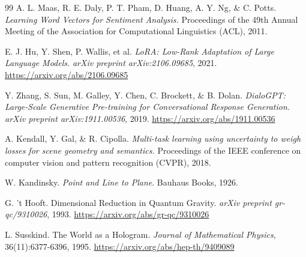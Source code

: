 \documentclass[11pt, a4paper]{article}
\begin{document}
\begin{thebibliography}{99}
			A. L. Maas, R. E. Daly, P. T. Pham, D. Huang, A. Y. Ng, \& C. Potts.
			\textit{Learning Word Vectors for Sentiment Analysis.}
			Proceedings of the 49th Annual Meeting of the Association for Computational Linguistics (ACL), 2011.
			
			E. J. Hu, Y. Shen, P. Wallis, et al.
			\textit{LoRA: Low-Rank Adaptation of Large Language Models.}
			\textit{arXiv preprint arXiv:2106.09685}, 2021. \url{https://arxiv.org/abs/2106.09685}
			
			Y. Zhang, S. Sun, M. Galley, Y. Chen, C. Brockett, \& B. Dolan.
			\textit{DialoGPT: Large-Scale Generative Pre-training for Conversational Response Generation.}
			\textit{arXiv preprint arXiv:1911.00536}, 2019. \url{https://arxiv.org/abs/1911.00536}
			
			A. Kendall, Y. Gal, \& R. Cipolla.
			\textit{Multi-task learning using uncertainty to weigh losses for scene geometry and semantics.}
			Proceedings of the IEEE conference on computer vision and pattern recognition (CVPR), 2018.
			
			
			
			W. Kandinsky. \textit{Point and Line to Plane}. Bauhaus Books, 1926.
			
			G. 't Hooft. Dimensional Reduction in Quantum Gravity. \textit{arXiv preprint gr-qc/9310026}, 1993. \url{https://arxiv.org/abs/gr-qc/9310026}
			
			L. Susskind. The World as a Hologram. \textit{Journal of Mathematical Physics}, 36(11):6377-6396, 1995. \url{https://arxiv.org/abs/hep-th/9409089}
			
			
		\end{thebibliography}
		
	
\end{document}
